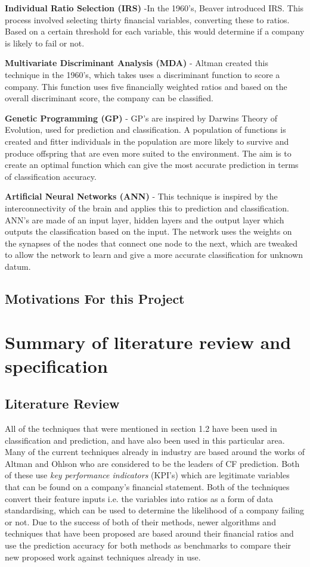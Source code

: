 \documentclass[11pt]{article}
\begin{document}
\textbf{Individual Ratio Selection (IRS)} -In the 1960's, Beaver introduced IRS. This process involved selecting thirty financial variables, converting these to ratios. Based on a certain threshold for each variable, this would determine if a company is likely to fail or not.


\textbf{Multivariate Discriminant Analysis (MDA)} - Altman created this technique in the 1960's, which takes uses a discriminant function to score a company. This function uses five financially weighted ratios and based on the overall discriminant score, the company can be classified. 

\textbf{Genetic Programming (GP)} - GP's are inspired by Darwins Theory of Evolution, used for prediction and classification. A population of functions is created and fitter individuals in the population are more likely to survive and produce offspring that are even more suited to the environment. The aim is to create an optimal function which can give the most accurate prediction in terms of classification accuracy. 

\textbf{Artificial Neural Networks (ANN)} - This technique is inspired by the interconnectivity of the brain and applies this to prediction and classification. ANN's are made of an input layer, hidden layers and the output layer which outputs the classification based on the input. The network uses the weights on the synapses of the nodes that connect one node to the next, which are tweaked to allow the network to learn and give a more accurate classification for unknown datum. 

\subsection{Motivations For this Project}

\newpage
\section{Summary of literature review and specification}\label{sec:spec}
\subsection{Literature Review}
All of the techniques that were mentioned in section 1.2 have been used in classification and prediction, and have also been used in this particular area. Many of the current techniques already in industry are based around the works of Altman and Ohlson who are considered to be the leaders of CF prediction. Both of these use \textit{key performance indicators} (KPI's) which are legitimate variables that can be found on a company's financial statement. Both of the techniques convert their feature inputs i.e. the variables into ratios as a form of data standardising, which can be used to determine the likelihood of a company failing or not. Due to the success of both of their methods, newer algorithms and techniques that have been proposed are based around their financial ratios and use the prediction accuracy for both methods as benchmarks to compare their new proposed work against techniques already in use. \\
\end{document}
